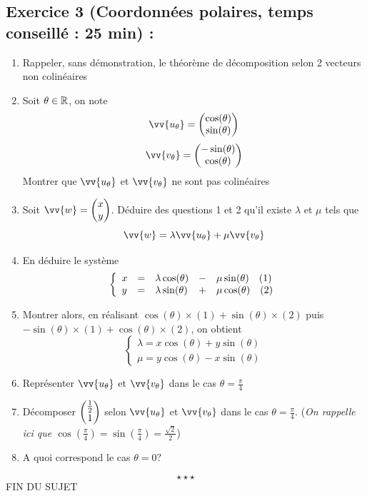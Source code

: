 \subsection*{Exercice 3 (Coordonnées polaires, temps conseillé : 25 min) : }
\begin{enumerate}
\item Rappeler, sans démonstration, le théorème de décomposition selon 2 vecteurs non colinéaires
\item Soit $\theta \in \mathbb{R}$, on note $$\vv{u_\theta}= \covec{\cos(\theta)}{\sin(\theta)}$$ $$\vv{v_\theta} = \covec{-\sin(\theta)}{\cos(\theta)}$$
Montrer que $\vv{u_\theta}$ et $\vv{v_\theta}$ ne sont pas colinéaires
\item Soit $\vv{w} = \covec{x}{y}$. Déduire des questions 1 et 2 qu'il existe $\lambda$ et $\mu$ tels que $$\vv{w} = \lambda \vv{u_\theta} + \mu \vv{v_\theta}$$
\item En déduire le système 
$$\left\{\begin{array}{l l l l l} x & = & \lambda \cos(\theta) & - & \mu \sin(\theta) \quad (1) \\ y & = & \lambda \sin(\theta) & + &\mu \cos(\theta) \quad (2)\end{array}\right.$$
\item Montrer alors, en réalisant $\cos(\theta) \times (1) + \sin(\theta) \times (2)$ puis $-\sin(\theta) \times (1) + \cos(\theta) \times (2)$, on obtient 
$$\left\{\begin{array}{l} \lambda = x\cos(\theta) + y \sin(\theta) \\  \mu = y\cos(\theta) - x \sin(\theta)\end{array}\right.$$
\item Représenter $\vv{u_\theta}$ et $\vv{v_\theta}$ dans le cas $\theta = \frac{\pi}{4}$
\item Décomposer $\displaystyle \begin{pmatrix}\frac{1}{2} \\1 \end{pmatrix}$ selon $\vv{u_\theta}$ et $\vv{v_\theta}$ dans le cas $\theta = \frac{\pi}{4}$. (\emph{On rappelle ici que $\cos(\frac{\pi}{4}) = \sin(\frac{\pi}{4}) = \frac{\sqrt{2}}{2}$})
\item A quoi correspond le cas $\theta = 0 ?$
\end{enumerate}
$$\star \star \star$$
\center
FIN DU SUJET

